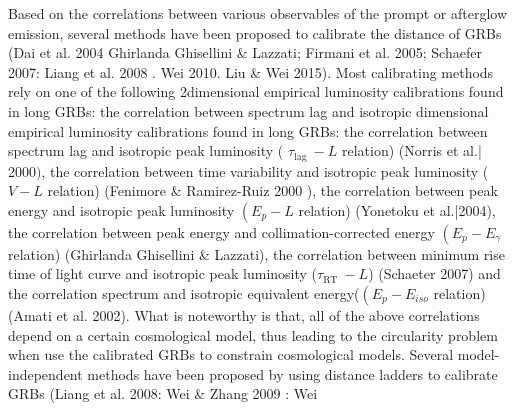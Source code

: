 \documentclass[10pt, a4paper]{article}
\begin{document}
Based on the correlations between various observables of the prompt or afterglow emission, several methods have been proposed to calibrate the distance of GRBs (Dai et al. 2004 Ghirlanda Ghisellini \& Lazzati; Firmani et al. 2005; Schaefer 2007: Liang et al. 2008 . Wei 2010. Liu \& Wei 2015). Most calibrating methods rely on one of the following 2dimensional empirical luminosity calibrations found in long GRBs: the correlation between spectrum lag and isotropic dimensional empirical luminosity calibrations found in long GRBs: the correlation between spectrum lag and isotropic peak luminosity ( $\tau_{\text {lag }}-L$ relation) (Norris et al.| 2000$)$, the correlation between time variability and isotropic peak luminosity ( $V-L$ relation) (Fenimore \& Ramirez-Ruiz 2000 ), the correlation between peak energy and isotropic peak luminosity $\left(E_{p}-L\right.$ relation) (Yonetoku et al.|2004), the correlation between peak energy and collimation-corrected energy $\left(E_{p}-E_{\gamma}\right.$ relation) (Ghirlanda Ghisellini \& Lazzati), the correlation between minimum rise time of light curve and isotropic peak luminosity ($\tau_{\text {RT }}-L$) (Schaeter 2007) and the correlation spectrum and isotropic equivalent energy($\left(E_{p}-E_{iso}\right.$ relation) (Amati et al. 2002). What is noteworthy is that, all of the above correlations depend on a certain cosmological model, thus leading to the circularity problem when use the calibrated GRBs to constrain cosmological models. Several model-independent methods have been proposed by using distance ladders to calibrate GRBs (Liang et al. 2008: Wei \& Zhang 2009 : Wei
\end{document}
